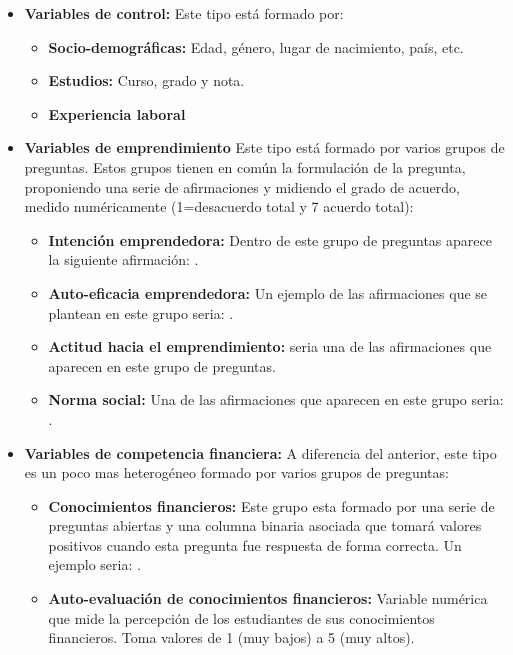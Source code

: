 \begin{itemize}
	\item \textbf{Variables de control:} Este tipo está formado por:
	\begin{itemize}
		\item \textbf{Socio-demográficas:} Edad, género, lugar de nacimiento, país, etc.
		\item \textbf{Estudios:} Curso, grado y nota.
		\item \textbf{Experiencia laboral}
	\end{itemize}
	\item \textbf{Variables de emprendimiento} Este tipo está formado por varios grupos de preguntas. Estos grupos tienen en común la formulación de la pregunta, proponiendo una serie de afirmaciones y midiendo el grado de acuerdo, medido numéricamente (1=desacuerdo total y 7 acuerdo total):
	\begin{itemize}
		\item \textbf{Intención emprendedora:} Dentro de este grupo de preguntas aparece la siguiente afirmación: .
		\item \textbf{Auto-eficacia emprendedora:} Un ejemplo de las afirmaciones que se plantean en este grupo seria: .
		\item \textbf{Actitud hacia el emprendimiento:}  seria una de las afirmaciones que aparecen en este grupo de preguntas.
		\item \textbf{Norma social:} Una de las afirmaciones que aparecen en este grupo seria: .
	\end{itemize}
	\item\textbf{Variables de competencia financiera:} A diferencia del anterior, este tipo es un poco mas heterogéneo formado por varios grupos de preguntas:
	\begin{itemize}
		\item \textbf{Conocimientos financieros:} Este grupo esta formado por una serie de preguntas abiertas y una columna binaria asociada que tomará valores positivos cuando esta pregunta fue respuesta de forma correcta. Un ejemplo seria: .
		\item \textbf{Auto-evaluación de conocimientos financieros:} Variable numérica que mide la percepción de los estudiantes de sus conocimientos financieros. Toma valores de 1 (muy bajos) a 5 (muy altos).

\end{itemize}
\end{itemize}

